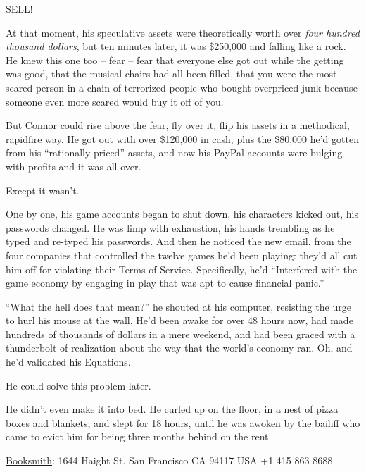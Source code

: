 SELL!

At that moment, his speculative assets were theoretically worth
over \emph{four hundred thousand dollars}, but ten minutes later,
it was \$250,000 and falling like a rock. He knew this one too --
fear -- fear that everyone else got out while the getting was good,
that the musical chairs had all been filled, that you were the most
scared person in a chain of terrorized people who bought overpriced
junk because someone even more scared would buy it off of you.

But Connor could rise above the fear, fly over it, flip his assets
in a methodical, rapidfire way. He got out with over \$120,000 in
cash, plus the \$80,000 he'd gotten from his ``rationally priced''
assets, and now his PayPal accounts were bulging with profits and
it was all over.

Except it wasn't.

One by one, his game accounts began to shut down, his characters
kicked out, his passwords changed. He was limp with exhaustion, his
hands trembling as he typed and re-typed his passwords. And then he
noticed the new email, from the four companies that controlled the
twelve games he'd been playing: they'd all cut him off for
violating their Terms of Service. Specifically, he'd ``Interfered
with the game economy by engaging in play that was apt to cause
financial panic.''

``What the hell does that mean?'' he shouted at his computer,
resisting the urge to hurl his mouse at the wall. He'd been awake
for over 48 hours now, had made hundreds of thousands of dollars in
a mere weekend, and had been graced with a thunderbolt of
realization about the way that the world's economy ran. Oh, and
he'd validated his Equations.

He could solve this problem later.

He didn't even make it into bed. He curled up on the floor, in a
nest of pizza boxes and blankets, and slept for 18 hours, until he
was awoken by the bailiff who came to evict him for being three
months behind on the rent.

\tb

{\href{http://thebooksmith.booksense.com}{Booksmith}: 1644 Haight St. San Francisco CA 94117 USA +1 415 863 8688}

